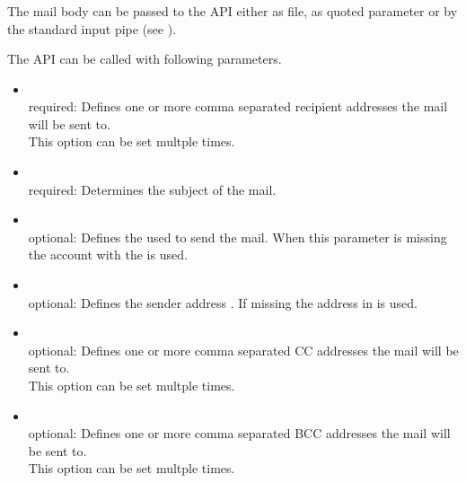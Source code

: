 \subsubsection{}
    The mail body can be passed to the API  
    either as file, as quoted parameter or by the standard input pipe
    (see ).

    The API can be called with following parameters.
    
\begin {itemize}
  \item [\var{-t},]  
    \\required: Defines one or more comma separated recipient addresses
    the mail will be sent to.
    \\ This option can be set multple times.

  \item [\var{-s},]  
    \\required: Determines the subject of the mail.
  
  \item [\var{-A},]  
    \\optional: Defines the 
    used to send the mail. When this parameter is missing the account
    with the   is used.
  
  \item [\var{-f},]  
    \\optional: Defines the sender address . 
    If missing the address in 
     is used.
  
  \item [\var{-c},]  
    \\optional: Defines one or more comma separated CC addresses
    the mail will be sent to.
    \\ This option can be set multple times.

  \item [\var{-b},]  
    \\optional: Defines one or more comma separated BCC addresses
    the mail will be sent to.
    \\ This option can be set multple times.


\end{itemize}
